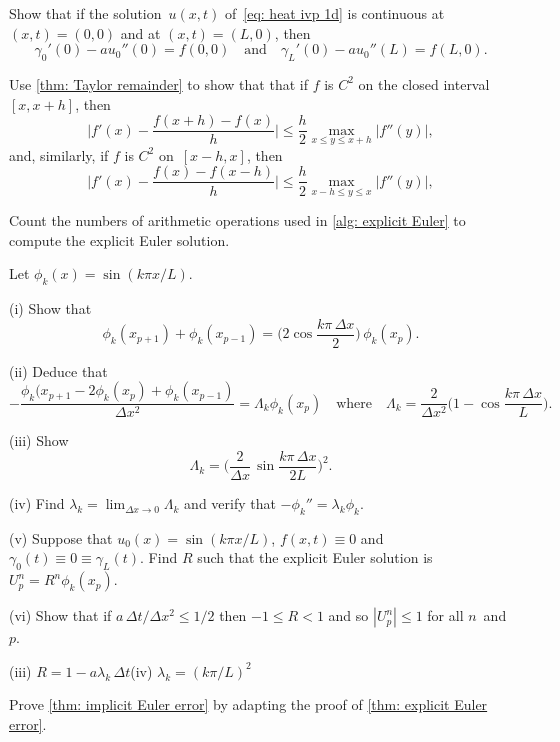 \begin{Exercises}

\exercise
Show that if the solution~$u(x,t)$ of~\eqref{eq: heat ivp 1d} is continuous
at $(x,t)=(0,0)$ and at $(x,t)=(L,0)$, then
\[
\gamma_0'(0)-au_0''(0)=f(0,0)
\quad\text{and}\quad
\gamma_L'(0)-au_0''(L)=f(L,0).
\]

\exercise\label{ex: forward diff}
Use \cref{thm: Taylor remainder} to show that that if $f$ is $C^2$ on 
the closed interval~$[x,x+h]$, then
\[
\biggl|f'(x)-\frac{f(x+h)-f(x)}{h}\biggr|
	\le\frac{h}{2}\max_{x\le y\le x+h}|f''(y)|,
\]
and, similarly, if $f$ is $C^2$ on~$[x-h,x]$, then
\[
\biggl|f'(x)-\frac{f(x)-f(x-h)}{h}\biggr|
	\le\frac{h}{2}\max_{x-h\le y\le x}|f''(y)|,
\]

\exercise
Count the numbers of arithmetic operations used in \cref{alg: explicit Euler} 
to compute the explicit Euler solution.

\exercise
Let $\phi_k(x)=\sin(k\pi x/L)$.
\begin{description}
\item{(i)} Show that 
\[
\phi_k(x_{p+1})+\phi_k(x_{p-1})=\biggl(2\cos\frac{k\pi\,\Delta x}{2}\biggr)\,
	\phi_k(x_p).
\]
\item{(ii)} Deduce that
\[
-\frac{\phi_k(x_{p+1}-2\phi_k(x_p)+\phi_k(x_{p-1})}{\Delta x^2}
	=\Lambda_k\phi_k(x_p)\quad\text{where}\quad
\Lambda_k=\frac{2}{\Delta x^2}\biggl(1-\cos\frac{k\pi\,\Delta x}{L}\biggr).
\]
\item{(iii)} Show
\[
\Lambda_k=\biggl(\frac{2}{\Delta x}\,\sin\frac{k\pi\,\Delta x}{2L}\biggr)^2.
\]
\item{(iv)}
Find $\lambda_k=\lim_{\Delta x\to0}\Lambda_k$ and verify that 
$-\phi_k''=\lambda_k\phi_k$.
\item{(v)}
Suppose that $u_0(x)=\sin(k\pi x/L)$, $f(x,t)\equiv0$ and 
$\gamma_0(t)\equiv 0\equiv\gamma_L(t)$.  Find $R$ such that the explicit
Euler solution is~$U^n_p=R^n\phi_k(x_p)$.
\item{(vi)} Show that if $a\,\Delta t/\Delta x^2\le1/2$ then $-1\le R<1$
and so $|U^n_p|\le1$ for all $n$~and $p$.
\end{description}
\begin{ans}
(iii) $R=1-a\lambda_k\,\Delta t$\quad(iv) $\lambda_k=(k\pi/L)^2$
\end{ans}

\exercise\label{ex: implicit Euler error}
Prove \cref{thm: implicit Euler error} by adapting the proof of 
\cref{thm: explicit Euler error}.


\end{Exercises}
